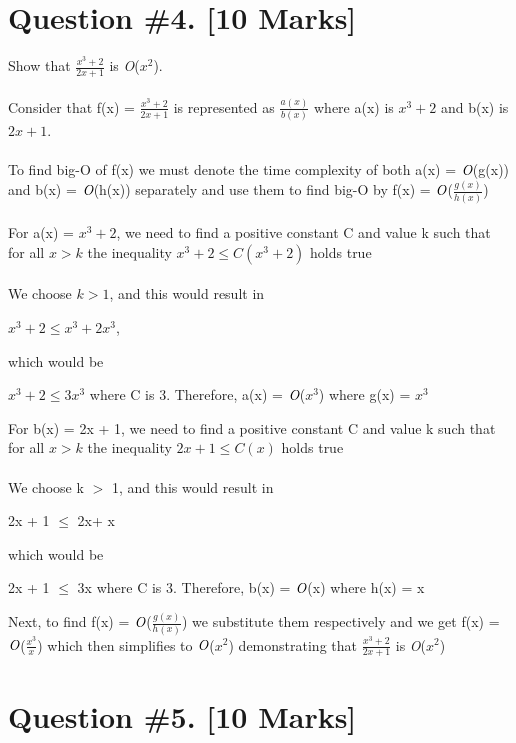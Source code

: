 \documentclass{article}
\begin{document}
\section{Question \#4. [10 Marks]}
Show that $\frac{x^3 + 2}{2x + 1}$ is \emph{O}($x^2$). \\ \\ 
Consider that f(x) = $\frac{x^3 + 2}{2x + 1}$ is represented as $ \frac {a(x)}{b(x)}$ where a(x) is ${x^3 + 2}$ and b(x) is ${2x + 1}$. \\ \\ 
To find big-O of f(x) we must denote the time complexity of both a(x) = $\emph {O}$(g(x)) and b(x) = $\emph {O}$(h(x)) separately and use them to find big-O by f(x) = $\emph {O}$($\frac {g(x)}{h(x)}$) \\ \\
For a(x) = ${x^3 + 2}$, we need to find a positive constant  C and value k such that for all  $x > k$ the inequality ${x^3 + 2} \leq C (x^3 + 2)$ holds true \\ \\
We choose $k>1$, and this would result in 
\begin{center} ${x^3 + 2} \leq x^3+ 2x^3$,
\end{center} 
which would be
\begin{center} 
${x^3 + 2} \leq 3x^3$ where C is 3. Therefore, a(x) = $\emph {O}$($x^3$) where g(x) = $x^3$ \\
\end{center}  
For b(x) = 2x + 1, we need to find a positive constant  C and value k such that for all  $x > k$ the inequality ${2x+ 1} \leq C (x)$ holds true \\ \\ 
We choose k $>$ 1, and this would result in 
\begin{center} 
2x + 1 $\leq$ 2x+ x
\end{center} 
which would be
\begin{center} 
2x + 1 $\leq$ 3x where C is 3. Therefore, b(x) = $\emph {O}$(x) where h(x) = x 
\end{center}  
Next, to find f(x) = $\emph {O}$($\frac{g(x)}{h(x)}$) we substitute them respectively and we get f(x)  = $\emph {O}$($\frac{x^3}{x}$) which then simplifies to $\emph {O}$($x^2$) demonstrating that $\frac{x^3 + 2}{2x + 1}$ is \emph{O}($x^2$)



\newpage


\section{Question \#5. [10 Marks]}
\end{document}
